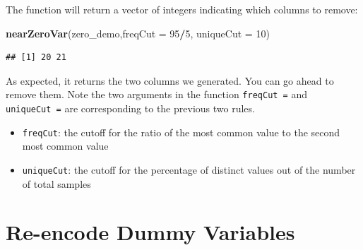 \documentclass[12pt,]{krantz}
\makeatletter
\newenvironment{Shaded}{\begin{snugshade}}{\end{snugshade}}
\newcommand{\CommentTok}[1]{\textcolor[rgb]{0.37,0.37,0.37}{\textit{#1}}}
\newcommand{\DataTypeTok}[1]{\textcolor[rgb]{0.27,0.27,0.27}{#1}}
\newcommand{\DecValTok}[1]{\textcolor[rgb]{0.06,0.06,0.06}{#1}}
\newcommand{\KeywordTok}[1]{\textcolor[rgb]{0.27,0.27,0.27}{\textbf{#1}}}
\newcommand{\NormalTok}[1]{#1}
\newcommand{\OperatorTok}[1]{\textcolor[rgb]{0.43,0.43,0.43}{\textbf{#1}}}
\newcommand{\StringTok}[1]{\textcolor[rgb]{0.5,0.5,0.5}{#1}}
\providecommand{\tightlist}{%
  \setlength{\itemsep}{0pt}\setlength{\parskip}{0pt}}
\newenvironment{kframe}{%
\medskip{}
\setlength{\fboxsep}{.8em}
 \def\at@end@of@kframe{}%
 \ifinner\ifhmode%
  \def\at@end@of@kframe{\end{minipage}}%
  \begin{minipage}{\columnwidth}%
 \fi\fi%
 \def\FrameCommand##1{\hskip\@totalleftmargin \hskip-\fboxsep
 \colorbox{shadecolor}{##1}\hskip-\fboxsep
     \hskip-\linewidth \hskip-\@totalleftmargin \hskip\columnwidth}%
 \MakeFramed {\advance\hsize-\width
   \@totalleftmargin\z@ \linewidth\hsize
   \@setminipage}}%
 {\par\unskip\endMakeFramed%
 \at@end@of@kframe}
\renewenvironment{Shaded}{\begin{kframe}}{\end{kframe}}
\makeatother
\begin{document}
\begin{Shaded}
\end{Shaded}

The function will return a vector of integers indicating which columns to remove:

\begin{Shaded}
\begin{Highlighting}[]
\KeywordTok{nearZeroVar}\NormalTok{(zero_demo,}\DataTypeTok{freqCut =} \DecValTok{95}\OperatorTok{/}\DecValTok{5}\NormalTok{, }\DataTypeTok{uniqueCut =} \DecValTok{10}\NormalTok{)}
\end{Highlighting}
\end{Shaded}

\begin{verbatim}
## [1] 20 21
\end{verbatim}

As expected, it returns the two columns we generated. You can go ahead to remove them. Note the two arguments in the function \texttt{freqCut\ =} and \texttt{uniqueCut\ =} are corresponding to the previous two rules.

\begin{itemize}
\tightlist
\item
  \texttt{freqCut}: the cutoff for the ratio of the most common value to the second most common value
\item
  \texttt{uniqueCut}: the cutoff for the percentage of distinct values out of the number of total samples
\end{itemize}

\hypertarget{re-encode-dummy-variables}{%
\section{Re-encode Dummy Variables}\label{re-encode-dummy-variables}}
\end{document}
